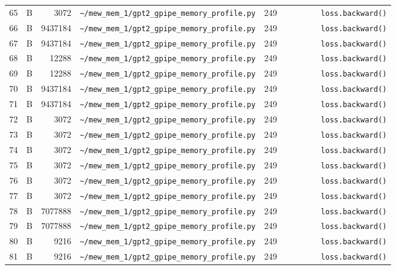 \documentclass{article}
\begin{document}
\begin{longtable}{r l r p{6.5cm} r p{7.0cm}}
65 & B & 3072 & \lstinline|~/mew_mem_1/gpt2_gpipe_memory_profile.py| & 249 & \lstinline|        loss.backward()| \\
66 & B & 9437184 & \lstinline|~/mew_mem_1/gpt2_gpipe_memory_profile.py| & 249 & \lstinline|        loss.backward()| \\
67 & B & 9437184 & \lstinline|~/mew_mem_1/gpt2_gpipe_memory_profile.py| & 249 & \lstinline|        loss.backward()| \\
68 & B & 12288 & \lstinline|~/mew_mem_1/gpt2_gpipe_memory_profile.py| & 249 & \lstinline|        loss.backward()| \\
69 & B & 12288 & \lstinline|~/mew_mem_1/gpt2_gpipe_memory_profile.py| & 249 & \lstinline|        loss.backward()| \\
70 & B & 9437184 & \lstinline|~/mew_mem_1/gpt2_gpipe_memory_profile.py| & 249 & \lstinline|        loss.backward()| \\
71 & B & 9437184 & \lstinline|~/mew_mem_1/gpt2_gpipe_memory_profile.py| & 249 & \lstinline|        loss.backward()| \\
72 & B & 3072 & \lstinline|~/mew_mem_1/gpt2_gpipe_memory_profile.py| & 249 & \lstinline|        loss.backward()| \\
73 & B & 3072 & \lstinline|~/mew_mem_1/gpt2_gpipe_memory_profile.py| & 249 & \lstinline|        loss.backward()| \\
74 & B & 3072 & \lstinline|~/mew_mem_1/gpt2_gpipe_memory_profile.py| & 249 & \lstinline|        loss.backward()| \\
75 & B & 3072 & \lstinline|~/mew_mem_1/gpt2_gpipe_memory_profile.py| & 249 & \lstinline|        loss.backward()| \\
76 & B & 3072 & \lstinline|~/mew_mem_1/gpt2_gpipe_memory_profile.py| & 249 & \lstinline|        loss.backward()| \\
77 & B & 3072 & \lstinline|~/mew_mem_1/gpt2_gpipe_memory_profile.py| & 249 & \lstinline|        loss.backward()| \\
78 & B & 7077888 & \lstinline|~/mew_mem_1/gpt2_gpipe_memory_profile.py| & 249 & \lstinline|        loss.backward()| \\
79 & B & 7077888 & \lstinline|~/mew_mem_1/gpt2_gpipe_memory_profile.py| & 249 & \lstinline|        loss.backward()| \\
80 & B & 9216 & \lstinline|~/mew_mem_1/gpt2_gpipe_memory_profile.py| & 249 & \lstinline|        loss.backward()| \\
81 & B & 9216 & \lstinline|~/mew_mem_1/gpt2_gpipe_memory_profile.py| & 249 & \lstinline|        loss.backward()| \\

\end{longtable}
\end{document}
